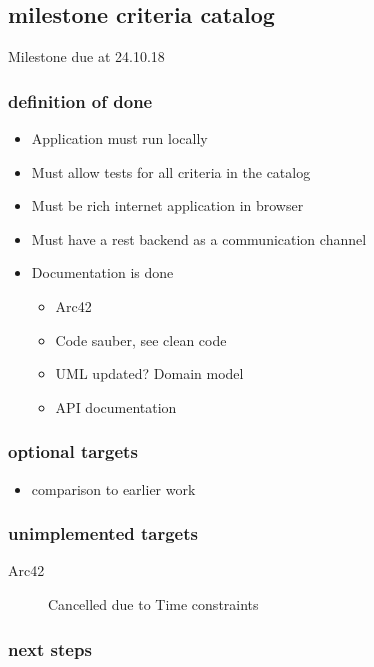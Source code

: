 \documentclass{article}
\begin{document}
        
    
\subsection{milestone criteria catalog}

Milestone due at 24.10.18

\subsubsection{definition of done}
\begin{itemize}
    \item Application must run locally \checkmark
    \item Must allow tests for all criteria in the catalog \checkmark
    \item Must be rich internet application in browser \checkmark
    \item Must have a rest backend as a communication channel \checkmark
    \item Documentation is done
    \begin{itemize}
        \item Arc42
        \item Code sauber, see clean code\cite{MartinRobertC2014} \checkmark
        \item UML updated? Domain model \checkmark
        \item API documentation \checkmark
    \end{itemize}
\end{itemize}

\subsubsection{optional targets}
\begin{itemize}
    \item comparison to earlier work
\end{itemize}

\subsubsection{unimplemented targets}
\begin{description}
    \item[Arc42] Cancelled due to Time constraints
    
\end{description}

\subsubsection{next steps}
\end{document}
